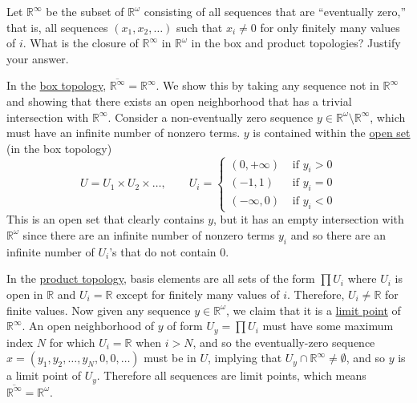   \begin{exercise}[Munkres 19.7]
    Let $\mathbb{R}^\infty$ be the subset of $\mathbb{R}^\omega$ consisting of all sequences that are ``eventually zero,'' that is, all sequences $(x_1, x_2, \ldots)$ such that $x_i \neq 0$ for only finitely many values of $i$. What is the closure of $\mathbb{R}^\infty$ in $\mathbb{R}^\omega$ in the box and product topologies? Justify your answer.
  \end{exercise}
  \begin{solution}
    In the \hyperref[def:box-topology]{box topology}, $\overline{\mathbb{R}^\infty} = \mathbb{R}^\infty$. We show this by taking any sequence not in $\mathbb{R}^\infty$ and showing that there exists an open neighborhood that has a trivial intersection with $\mathbb{R}^\infty$. Consider a non-eventually zero sequence $y \in \mathbb{R}^\omega \setminus \mathbb{R}^\infty$, which must have an infinite number of nonzero terms. $y$ is contained within the \hyperref[def:open-set]{open set} (in the box topology) 
    \begin{equation}
      U = U_1 \times U_2 \times \ldots, \qquad U_i = 
      \begin{cases}
        (0, +\infty) & \text{ if } y_i > 0 \\
        (-1, 1)  & \text{ if } y_i = 0 \\
        (-\infty, 0) & \text{ if } y_i < 0
      \end{cases}
    \end{equation}
    This is an open set that clearly contains $y$, but it has an empty intersection with $\mathbb{R}^\omega$ since there are an infinite number of nonzero terms $y_i$ and so there are an infinite number of $U_i$'s that do not contain $0$. 

    In the \hyperref[def:product-topology]{product topology}, basis elements are all sets of the form $\prod U_i$ where $U_i$ is open in $\mathbb{R}$ and $U_i = \mathbb{R}$ except for finitely many values of $i$. Therefore, $U_i \neq \mathbb{R}$ for finite values. Now given any sequence $y \in \mathbb{R}^\omega$, we claim that it is a \hyperref[def:limit-point]{limit point} of $\mathbb{R}^\infty$. An open neighborhood of $y$ of form $U_y = \prod U_i$ must have some maximum index $N$ for which $U_i = \mathbb{R}$ when $i > N$, and so the eventually-zero sequence $x = (y_1, y_2, \ldots, y_N, 0, 0 ,\ldots)$ must be in $U$, implying that $U_y \cap \mathbb{R}^\infty \neq \emptyset$, and so $y$ is a limit point of $U_y$. Therefore all sequences are limit points, which means $\overline{\mathbb{R}^\infty} = \mathbb{R}^\omega$. 
  \end{solution}

